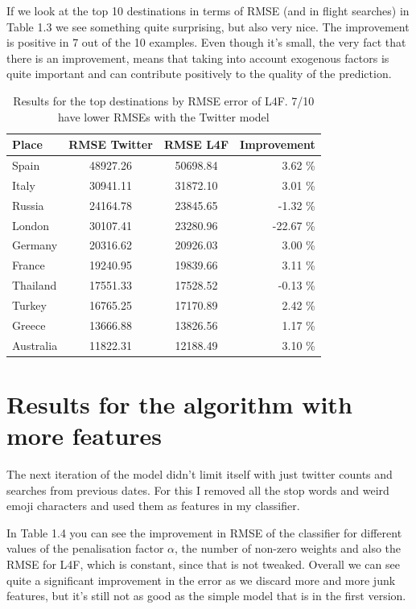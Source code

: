 \documentclass[minf,frontabs,twoside,singlespacing,parskip]{infthesis}
\begin{document}
If we look at the top 10 destinations in terms of RMSE (and in flight searches) in Table 1.3 we see something quite surprising, but also very nice. The improvement is positive in 7 out of the 10 examples. Even though it's small, the very fact that there is an improvement, means that taking into account exogenous factors is quite important and can contribute positively to the quality of the prediction.


\begin{table}[]
\begin{center}
\begin{tabular}{ l | c | c | r}
Place & RMSE Twitter & RMSE L4F & Improvement \\
\hline
Spain & 48927.26 & 50698.84 & 3.62 \% \\ 
Italy & 30941.11 & 31872.10 & 3.01 \% \\ 
Russia & 24164.78 & 23845.65 & -1.32 \% \\ 
London & 30107.41 & 23280.96 & -22.67 \% \\ 
Germany & 20316.62 & 20926.03 & 3.00 \% \\ 
France & 19240.95 & 19839.66 & 3.11 \% \\ 
Thailand & 17551.33 & 17528.52 & -0.13 \% \\ 
Turkey & 16765.25 & 17170.89 & 2.42 \% \\ 
Greece & 13666.88 & 13826.56 & 1.17 \% \\ 
Australia & 11822.31 & 12188.49 & 3.10 \% \\
\end{tabular}
\end{center}
\caption{Results for the top destinations by RMSE error of L4F. 7/10 have lower RMSEs with the Twitter model}
\end{table}


\section{Results for the algorithm with more features}

The next iteration of the model didn't limit itself with just twitter counts and searches from previous dates. For this I removed all the stop words and weird emoji characters and used them as features in my classifier. 

In Table 1.4 you can see the improvement in RMSE of the classifier for different values of the penalisation factor $\alpha$, the number of non-zero weights and also the RMSE for L4F, which is constant, since that is not tweaked. Overall we can see quite a significant improvement in the error as we discard more and more junk features, but it's still not as good as the simple model that is in the first version. 
\end{document}
